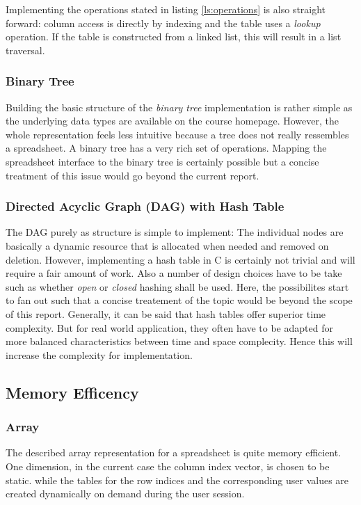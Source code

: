 \documentclass[a4paper,11pt,twoside]{article}
\begin{document}
Implementing the operations stated in listing \ref{ls:operations}
is also straight forward: column access is directly by indexing and
the table uses a \textit{lookup} operation. If the table is
constructed from a linked list, this will result in a list traversal. 



\subsubsection{Binary Tree}
Building the basic structure of the \textit{binary tree}
implementation is rather simple as the underlying data
types are available on the course homepage. However, the whole
representation feels less intuitive because a tree does not really
ressembles a spreadsheet. A binary tree has a very rich set of
operations. Mapping the spreadsheet interface to the binary tree is
certainly possible but a concise treatment of this issue would go
beyond the current report.


\subsubsection{Directed Acyclic Graph (DAG) with Hash Table}
The DAG purely as structure is simple to implement: The individual
nodes are basically a dynamic resource that is allocated when needed
and removed on deletion. However, implementing a hash table in C is
certainly not trivial and will require a fair amount of work. Also a
number of design choices have to be take such as whether \textit{open}
or \textit{closed} hashing shall be used. Here, the possibilites start
to fan out such that a concise treatement of the topic would be beyond
the scope of this report. Generally, it can be said that hash tables
offer superior time complexity. But for real world application, they
often have to be adapted for more balanced characteristics between
time and space complecity. Hence this will increase the complexity for
implementation.

\subsection{Memory Efficency}
\subsubsection{Array}
The described array representation for a spreadsheet is quite memory
efficient. One dimension, in the current case the column index vector,
is chosen to be static. while the tables for the row indices
and the corresponding user values are created dynamically on demand
during the user session.  
\end{document}
